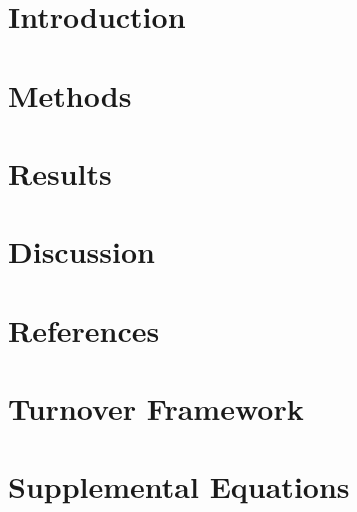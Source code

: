 \documentclass[review,3p,authoryear]{elsarticle}
\begin{document}

\clearpage
\section{Introduction}\label{s:intro}

\section{Methods}\label{s:methods}

\section{Results}\label{s:results}

\section{Discussion}\label{s:discussion}

\clearpage

\clearpage
\section*{References}
\clearpage
\initappendix
\section{Turnover Framework}\label{a:framework}

\clearpage
\section{Supplemental Equations}\label{a:eqs}

\clearpage
\end{document}
